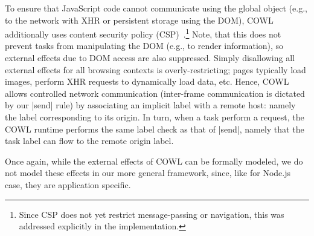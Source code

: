 To ensure that JavaScript code cannot communicate using the global object
(e.g., to the network with XHR or persistent storage using the DOM),
COWL additionally uses content security policy (CSP)~\cite{csp1.1}.\footnote{
  Since CSP does not yet restrict message-passing or navigation, this
  was addressed explicitly in the implementation.
}
%
Note, that this does not prevent tasks from manipulating the DOM
(e.g., to render information), so external effects due to DOM access
are also suppressed.
%
Simply disallowing all external effects for all browsing contexts is
overly-restricting; pages typically load images, perform XHR requests
to dynamically load data,
etc.
%
Hence, COWL allows
controlled network communication (inter-frame communication is
dictated by our |send| rule) by associating an implicit label with a
remote host: namely the label corresponding to its origin.
%
In turn, when a task perform a request, the COWL runtime performs the
same label check as that of |send|, namely that the task label can
flow to
the remote origin label.

Once again, while the external effects of COWL can be formally modeled,
we do not model these effects in our more general framework, since, like
for Node.js case, they are application specific.
%



